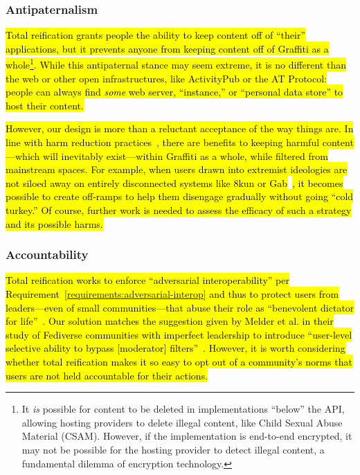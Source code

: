 \subsubsection{Antipaternalism}

\hl{%
Total reification grants people the ability to keep content off of ``their'' applications,
but it prevents anyone from keeping content off of Graffiti as a whole\footnote{%
It \emph{is} possible for content to be deleted in implementations ``below'' the API,
allowing hosting providers to delete illegal content,
like Child Sexual Abuse Material (CSAM).
However, if the implementation is end-to-end encrypted,
it may not be possible for the hosting provider to
detect illegal content,
a fundamental dilemma of encryption technology.
}.
While this antipaternal stance may seem extreme,
it is no different than the web or other open infrastructures,
like ActivityPub or the AT Protocol:
people can always find \emph{some}
web server, ``instance,''
or ``personal data store'' to host their content.
}%

\hl{%
However, our design is more than a reluctant acceptance of the way things are.
In line with harm reduction practices~\expandafter{\expandafter\cite{harmreduction}},
there are benefits to keeping harmful content---which will inevitably
exist---within Graffiti as a whole, while filtered from mainstream spaces.
For example, when users drawn into extremist ideologies are not
siloed away on entirely disconnected systems
like 8kun or Gab}~\cite{8kun,gab}\hl{, it becomes possible to create off-ramps
to help them disengage gradually without going ``cold turkey.''
Of course, further work is needed to assess the efficacy of
such a strategy and its possible harms.
}%


\subsubsection{Accountability}

\hl{%
Total reification works to enforce ``adversarial interoperability''
per Requirement~{\ref{requirements:adversarial-interop}}
and thus to protect users from leaders---even of small communities---that abuse their role as
``benevolent dictator for life''~{\cite{governablespaces}}.
Our solution matches the suggestion given by Melder et al.
in their study of Fediverse communities with imperfect leadership
to introduce ``user-level selective ability to bypass [moderator] filters''~{\cite{blocklistboundary}}.
However, it is worth considering whether total reification makes it so easy
to opt out of a community's norms that users are not held accountable for their actions.
}%

